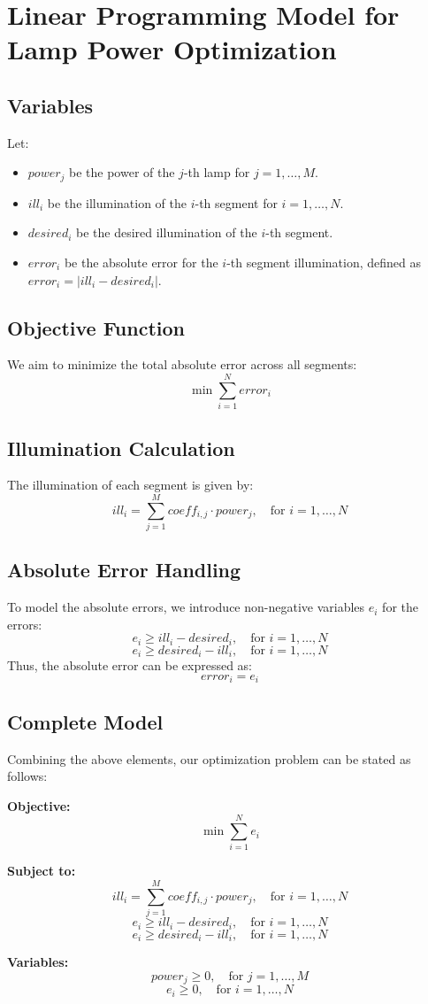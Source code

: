 \documentclass{article}
\begin{document}
\section*{Linear Programming Model for Lamp Power Optimization}

\subsection*{Variables}
Let:
\begin{itemize}
    \item $power_j$ be the power of the $j$-th lamp for $j = 1, \ldots, M$.
    \item $ill_i$ be the illumination of the $i$-th segment for $i = 1, \ldots, N$.
    \item $desired_i$ be the desired illumination of the $i$-th segment.
    \item $error_i$ be the absolute error for the $i$-th segment illumination, defined as $error_i = |ill_i - desired_i|$.
\end{itemize}

\subsection*{Objective Function}
We aim to minimize the total absolute error across all segments:
\[
\min \sum_{i=1}^{N} error_i
\]

\subsection*{Illumination Calculation}
The illumination of each segment is given by:
\[
ill_i = \sum_{j=1}^{M} coeff_{i,j} \cdot power_j, \quad \text{for } i = 1, \ldots, N
\]

\subsection*{Absolute Error Handling}
To model the absolute errors, we introduce non-negative variables $e_i$ for the errors:
\[
e_i \geq ill_i - desired_i, \quad \text{for } i = 1, \ldots, N
\]
\[
e_i \geq desired_i - ill_i, \quad \text{for } i = 1, \ldots, N
\]
Thus, the absolute error can be expressed as:
\[
error_i = e_i
\]

\subsection*{Complete Model}
Combining the above elements, our optimization problem can be stated as follows:

\textbf{Objective:}
\[
\min \sum_{i=1}^{N} e_i
\]

\textbf{Subject to:}
\[
ill_i = \sum_{j=1}^{M} coeff_{i,j} \cdot power_j, \quad \text{for } i = 1, \ldots, N
\]
\[
e_i \geq ill_i - desired_i, \quad \text{for } i = 1, \ldots, N
\]
\[
e_i \geq desired_i - ill_i, \quad \text{for } i = 1, \ldots, N
\]

\textbf{Variables:}
\[
power_j \geq 0, \quad \text{for } j = 1, \ldots, M
\]
\[
e_i \geq 0, \quad \text{for } i = 1, \ldots, N
\]
\end{document}
